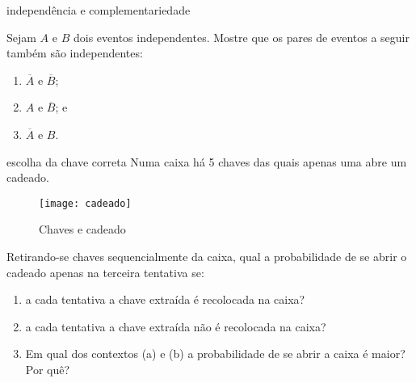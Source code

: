 \begin{task}{independência e complementariedade}


Sejam \(A\) e \(B\) dois eventos independentes.  Mostre que os pares de eventos a seguir também são independentes:
\begin{enumerate}
\item {} 
\(\overline{A}\) e \(\overline{B}\);

\item {} 
\(A\) e \(\overline{B}\); e

\item {} 
\(\overline{A}\) e \(B\).

\end{enumerate}
\end{task}

\begin{task}{escolha da chave correta}
Numa caixa há 5 chaves das quais apenas uma abre um cadeado.

\begin{figure}[H]
\centering
\texttt{[image: cadeado]}

\caption{Chaves e cadeado}

\end{figure}
Retirando-se chaves sequencialmente da caixa, qual a probabilidade de se abrir o cadeado apenas na terceira tentativa se:
\begin{enumerate}
\item a cada tentativa a chave extraída é recolocada na caixa?
\item a cada tentativa a chave extraída não é recolocada na caixa?
\item Em qual dos contextos (a) e (b) a probabilidade de se abrir a caixa é maior? Por quê?
\end{enumerate}

\end{task}

